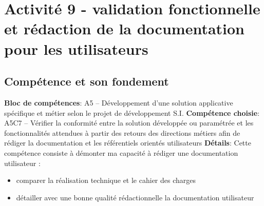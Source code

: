 \documentclass[a4paper, 11pt]{report}
\begin{document}
\section{Activité 9 - validation fonctionnelle et rédaction de la documentation pour les utilisateurs}
\subsection{Compétence et son fondement}
\textbf{Bloc de compétences}: A5 – Développement d’une solution applicative spécifique et métier selon le projet de développement S.I.
\newline
\textbf{Compétence choisie}: A5C7 – Vérifier la conformité entre la solution développée ou paramétrée et les fonctionnalités attendues à partir des retours des directions métiers afin de rédiger la documentation et les référentiels orientés utilisateurs
\newline
\textbf{Détails}: Cette compétence consiste à démonter ma capacité à rédiger une documentation utilisateur :
\begin{itemize}
  \item comparer la réalisation technique et le cahier des charges
  \item détailler avec une bonne qualité rédactionnelle la documentation utilisateur
\end{itemize}
\end{document}
